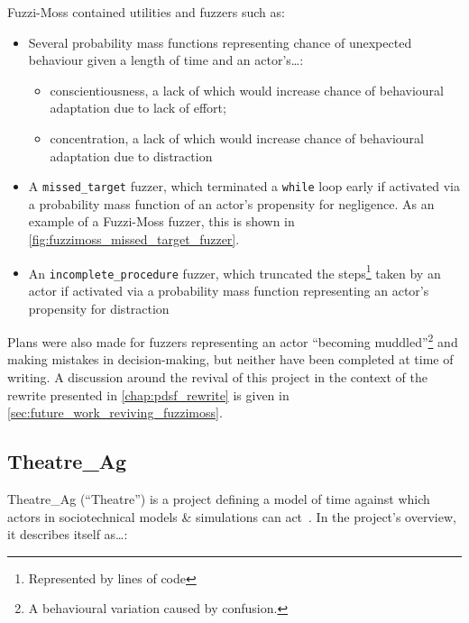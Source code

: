 Fuzzi-Moss contained utilities and fuzzers such as:

\begin{itemize}
    \item Several probability mass functions representing chance of
    unexpected behaviour given a length of time and an actor's\ldots{}:
    \begin{itemize}
        \item conscientiousness, a lack of which would increase chance of behavioural adaptation due to lack
    of effort;
        \item concentration, a lack of which would increase chance of behavioural
    adaptation due to distraction
    \end{itemize}
    \item A \lstinline{missed_target} fuzzer, which terminated a
    \lstinline{while} loop early if activated via a probability mass function of
    an actor's propensity for negligence. As an example of a Fuzzi-Moss fuzzer,
    this is shown in \cref{fig:fuzzimoss_missed_target_fuzzer}.
    \item An \lstinline{incomplete_procedure} fuzzer, which truncated the
    steps\footnote{Represented by lines of code} taken by an actor if activated
    via a probability mass function representing an actor's propensity for
    distraction
\end{itemize}

Plans were also made for fuzzers representing an actor ``becoming
muddled''\footnote{A behavioural variation caused by confusion.} and making
mistakes in decision-making, but neither have been completed at time of writing.
A discussion around the revival of this project in the context of the \pdsf
rewrite presented in \cref{chap:pdsf_rewrite} is given in
\cref{sec:future_work_reviving_fuzzimoss}. 


\subsection{Theatre\_Ag}\label{subsec:prior_work_theatre}

Theatre\_Ag (``Theatre'') is a project defining a model of time against which actors in
sociotechnical models \& simulations can act~\cite{theatre_ag_repo}. In the
project's overview, it describes itself as\ldots{}:

